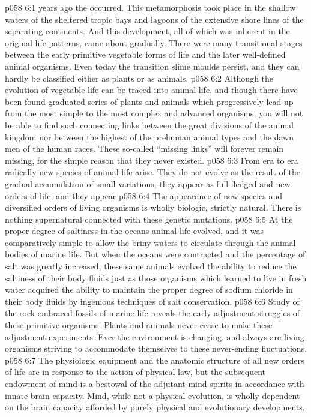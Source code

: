 \vs p058 6:1  years ago the  occurred. This metamorphosis took place in the shallow waters of the sheltered tropic bays and lagoons of the extensive shore lines of the separating continents. And this development, all of which was inherent in the original life patterns, came about gradually. There were many transitional stages between the early primitive vegetable forms of life and the later well\hyp{}defined animal organisms. Even today the transition slime moulds persist, and they can hardly be classified either as plants or as animals.
\vs p058 6:2 \pc Although the evolution of vegetable life can be traced into animal life, and though there have been found graduated series of plants and animals which progressively lead up from the most simple to the most complex and advanced organisms, you will not be able to find such connecting links between the great divisions of the animal kingdom nor between the highest of the prehuman animal types and the dawn men of the human races. These so\hyp{}called “missing links” will forever remain missing, for the simple reason that they never existed.
\vs p058 6:3 From era to era radically new species of animal life arise. They do not evolve as the result of the gradual accumulation of small variations; they appear as full\hyp{}fledged and new orders of life, and they appear 
\vs p058 6:4 The  appearance of new species and diversified orders of living organisms is wholly biologic, strictly natural. There is nothing supernatural connected with these genetic mutations.
\vs p058 6:5 At the proper degree of saltiness in the oceans animal life evolved, and it was comparatively simple to allow the briny waters to circulate through the animal bodies of marine life. But when the oceans were contracted and the percentage of salt was greatly increased, these same animals evolved the ability to reduce the saltiness of their body fluids just as those organisms which learned to live in fresh water acquired the ability to maintain the proper degree of sodium chloride in their body fluids by ingenious techniques of salt conservation.
\vs p058 6:6 Study of the rock\hyp{}embraced fossils of marine life reveals the early adjustment struggles of these primitive organisms. Plants and animals never cease to make these adjustment experiments. Ever the environment is changing, and always are living organisms striving to accommodate themselves to these never\hyp{}ending fluctuations.
\vs p058 6:7 The physiologic equipment and the anatomic structure of all new orders of life are in response to the action of physical law, but the subsequent endowment of mind is a bestowal of the adjutant mind\hyp{}spirits in accordance with innate brain capacity. Mind, while not a physical evolution, is wholly dependent on the brain capacity afforded by purely physical and evolutionary developments.
